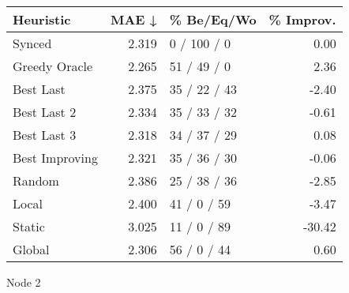\begin{tabular}{lrlr}
\toprule
\textbf{Heuristic} & \textbf{MAE ↓} & \textbf{\% Be/Eq/Wo} & \textbf{\% Improv.} \\
\midrule
            Synced &          2.319 &          0 / 100 / 0 &                0.00 \\
     Greedy Oracle &          2.265 &          51 / 49 / 0 &                2.36 \\
         Best Last &          2.375 &         35 / 22 / 43 &               -2.40 \\
       Best Last 2 &          2.334 &         35 / 33 / 32 &               -0.61 \\
       Best Last 3 &          2.318 &         34 / 37 / 29 &                0.08 \\
    Best Improving &          2.321 &         35 / 36 / 30 &               -0.06 \\
            Random &          2.386 &         25 / 38 / 36 &               -2.85 \\
             Local &          2.400 &          41 / 0 / 59 &               -3.47 \\
            Static &          3.025 &          11 / 0 / 89 &              -30.42 \\
            Global &          2.306 &          56 / 0 / 44 &                0.60 \\
\bottomrule
\end{tabular}
\caption{Node 2}
\label{tab:hr_iid_lr05_le2_bs4_2}
